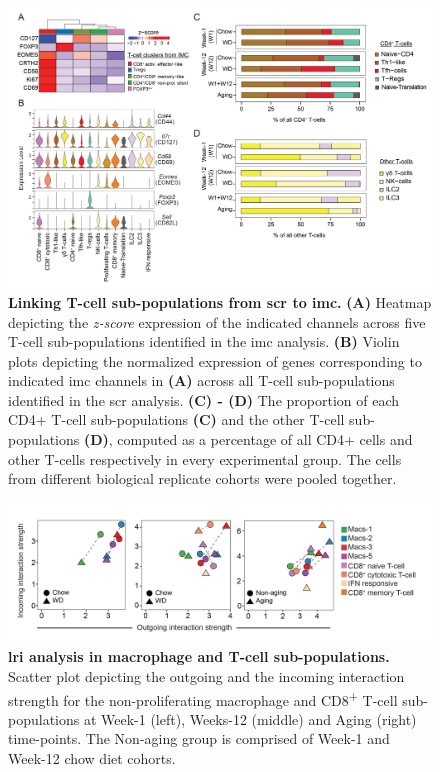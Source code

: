 \begin{figure}[H]
    \centering
    \includegraphics[width=\linewidth]{Appendix2/Fig/F2-A8-01.png}
    \caption[Linking T-cell sub-populations from  to ]{\textbf{Linking T-cell sub-populations from \gls{scr} to \gls{imc}.} \textbf{(A)} Heatmap depicting the \textit{z-score} expression of the indicated channels across five T-cell sub-populations identified in the \gls{imc} analysis. \textbf{(B)} Violin plots depicting the normalized expression of genes corresponding to indicated \gls{imc} channels in \textbf{(A)} across all T-cell sub-populations identified in the \gls{scr} analysis. \textbf{(C) - (D)} The proportion of each CD4+ T-cell sub-populations \textbf{(C)} and the other T-cell sub-populations \textbf{(D)}, computed as a percentage of all CD4+ cells and other T-cells respectively in every experimental group. The cells from different biological replicate cohorts were pooled together.}
    \label{fig:app_scrna_tcells1}
\end{figure}


\begin{figure}[H]
    \centering
    \includegraphics[width=\linewidth]{Appendix2/Fig/F2-A1-v3-01.png}
    \caption[ analysis in macrophage and T-cell sub-populations]{\textbf{\gls{lri} analysis in macrophage and T-cell sub-populations.} Scatter plot depicting the outgoing and the incoming interaction strength for the non-proliferating macrophage and CD8\textsuperscript{+} T-cell sub-populations at Week-1 (left), Weeks-12 (middle) and Aging (right) time-points. The Non-aging group is comprised of Week-1 and Week-12 chow diet cohorts.}
    \label{fig:app_scrna_cellchat1}
\end{figure}

